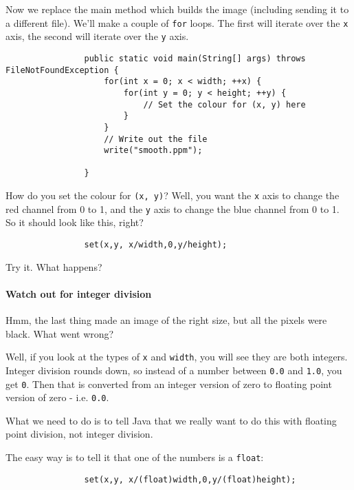 \documentclass{article}
\begin{document}
            Now we replace the main method which builds the image (including sending it to a different file). We'll make a couple of
            \texttt{for} loops. The first will iterate over the \texttt{x} axis, the second will iterate over the \texttt{y} axis.

            \begin{verbatim}
                public static void main(String[] args) throws FileNotFoundException {
                    for(int x = 0; x < width; ++x) {
                        for(int y = 0; y < height; ++y) {
                            // Set the colour for (x, y) here
                        }
                    }
                    // Write out the file
                    write("smooth.ppm");
                    
                }
            \end{verbatim}
        
            How do you set the colour for \texttt{(x, y)}? Well, you want the \texttt{x} axis to change the red channel from 0 to 1, and
            the \texttt{y} axis to change the blue channel from 0 to 1. So it should look like this, right?
            
            \begin{verbatim}
                set(x,y, x/width,0,y/height);
            \end{verbatim}
            
            Try it. What happens?
        
        \paragraph{Watch out for integer division}
            Hmm, the last thing made an image of the right size, but all the pixels were black.  What went wrong?
            
            Well, if you look at the types of \texttt{x} and \texttt{width}, you will see they are both integers. Integer division rounds
            down, so instead of a number between \texttt{0.0} and \texttt{1.0}, you get \texttt{0}. Then that is converted from an integer
            version of zero to floating point version of zero - i.e. \texttt{0.0}.
            
            What we need to do is to tell Java that we really want to do this with floating point division, not integer division. 
            
            The easy way is to tell it that one of the numbers is a \texttt{float}:
            \begin{verbatim}
                set(x,y, x/(float)width,0,y/(float)height);
            \end{verbatim}
            
\end{document}
